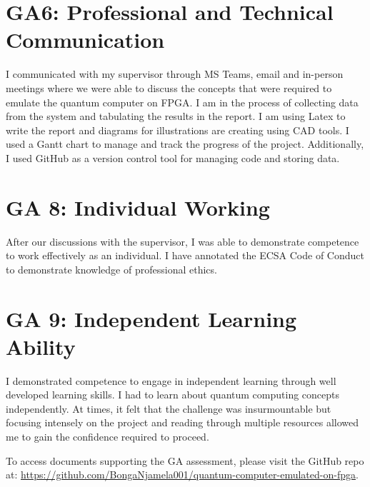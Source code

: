 \section{GA6: Professional and Technical Communication}

I communicated with my supervisor through MS Teams, email and in-person meetings where we were able to discuss the concepts that were required to emulate the quantum computer on FPGA. I am in the process of collecting data from the system and tabulating the results in the report. I am using Latex to write the report and diagrams for illustrations are creating using CAD tools. I used a Gantt chart to manage and track the progress of the project. Additionally, I used GitHub as a version control tool for managing code and storing data.

\section{GA 8: Individual Working}

After our discussions with the supervisor, I was able to demonstrate competence to work effectively as an individual. I have annotated the ECSA Code of Conduct to demonstrate knowledge of professional ethics.

\section{GA 9: Independent Learning Ability}

I demonstrated competence to engage in independent learning through well developed learning skills.   I had to learn about quantum computing concepts independently. At times, it felt that the challenge was insurmountable but focusing intensely on the project and reading through multiple resources allowed me to gain the confidence required to proceed.

To access documents supporting the GA assessment, please visit the GitHub repo at: \url{https://github.com/BongaNjamela001/quantum-computer-emulated-on-fpga}.